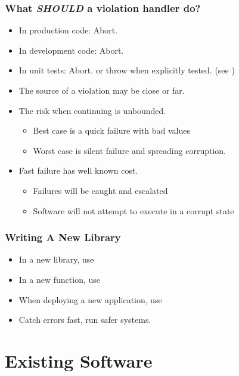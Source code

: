 \begin{frame}[fragile]
  \frametitle{What \emph{SHOULD} a violation handler do?}
  \begin{itemize} \pause
  \item{In production code: Abort.}\pause
  \item{In development code: Abort.} \pause
  \item{In unit tests: Abort. \pause or throw when explicitly tested. (see )} \pause
  \item{The source of a violation may be close or far.} \pause
  \item The risk when continuing is unbounded. \pause
    \begin{itemize}
    \item{Best case is a quick failure with bad values} \pause
    \item{Worst case is silent failure and spreading corruption.} \pause
    \end{itemize} 
  \item Fast failure has well known cost. \pause
    \begin{itemize}
    \item{Failures will be caught and escalated} \pause
    \item{Software will not attempt to execute in a corrupt state} 
    \end{itemize} 
  \end{itemize}
\end{frame}

\begin{frame}[fragile]
  \frametitle{Writing A New Library}
  \begin{itemize}\pause
  \item{In a new library, use } \pause
  \item{In a new function, use } \pause
  \item{When deploying a new application, use } \pause
  \end{itemize} 
  \begin{itemize}
  \item{Catch errors fast, run safer systems.}
  \end{itemize}
\end{frame}
    

\section{Existing Software}
\begin{frame}
\end{frame}

